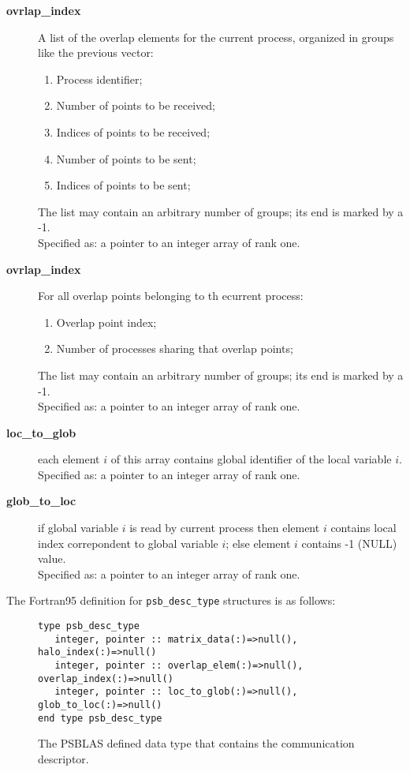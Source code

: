 \begin{description}
\item [{\bf ovrlap\_index}] A list of the overlap elements for the
current process, organized in groups like the previous vector:
\begin{enumerate}
\item Process identifier;
\item Number of points to be received;
\item Indices of points to be received;
\item Number of points to be sent;
\item Indices of points to be sent;
\end{enumerate}
The list may contain an arbitrary number of groups; its end is marked
by a -1.\\
Specified as: a pointer to an integer array  of rank one.
\item [{\bf ovrlap\_index}] For all overlap points belonging to th
ecurrent process:
\begin{enumerate}
\item  Overlap point index;
\item  Number of processes sharing that overlap points;
\end{enumerate}
The list may contain an arbitrary number of groups; its end is marked
by a -1.\\
Specified as: a pointer to an integer array of rank one.
\item[{\bf loc\_to\_glob}] each element $i$ of this array contains
global identifier of the local variable $i$.\\
Specified as: a pointer to an integer array of rank one.
\item[{\bf glob\_to\_loc}]  if global variable $i$ is read by current
process then element $i$ contains local index correpondent to global variable $i$;
else element $i$ contains -1 (NULL) value.\\
Specified as: a pointer to an integer array of rank one.
\end{description}
The Fortran95 definition  for \verb|psb_desc_type| structures is 
as follows:
\begin{figure}[h!]
  \begin{Sbox}
    \begin{minipage}[tl]{0.9\textwidth}
\begin{verbatim} 
type psb_desc_type 
   integer, pointer :: matrix_data(:)=>null(), halo_index(:)=>null()
   integer, pointer :: overlap_elem(:)=>null(), overlap_index(:)=>null()
   integer, pointer :: loc_to_glob(:)=>null(), glob_to_loc(:)=>null()
end type psb_desc_type 
\end{verbatim}
    \end{minipage}
  \end{Sbox}
  \setlength{\fboxsep}{8pt}
  \begin{center}
    \fbox{\TheSbox}
  \end{center}
  \caption{\label{fig:desctype}The PSBLAS defined data type that
    contains the communication descriptor.}
\end{figure}

